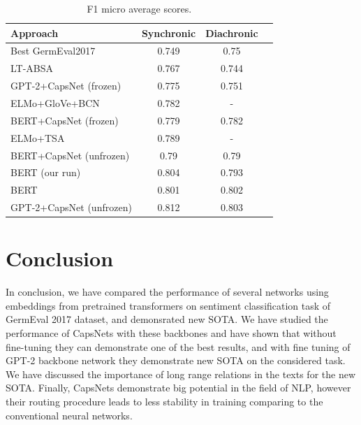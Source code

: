 \documentclass{article}
\begin{document}
\begin{table}[tbh!]
\begin{center}	
\begin{tabular}[t]{|l|ccc|}
\hline
Approach & Synchronic  & Diachronic \\
\hline
Best GermEval2017 \cite{germevaltask2017} & 0.749 & 0.75  \\ %
LT-ABSA \cite{ruppert2017lt} & 0.767 & 0.744 \\
GPT-2+CapsNet (frozen) & 0.775 & 0.751 \\
ELMo+GloVe+BCN \cite{biesialska2020sentiment} & 0.782 & - \\
BERT+CapsNet (frozen) & 0.779 & 0.782\\
ELMo+TSA \cite{biesialska2020sentiment} & 0.789 & - \\
BERT+CapsNet (unfrozen) & 0.79 & 0.79 \\
BERT (our run) & 0.804 & 0.793 \\
BERT \cite{kostic2020} & 0.801 & 0.802 \\
GPT-2+CapsNet (unfrozen) & 0.812 & 0.803\\
\hline
\end{tabular}
\caption{F1 micro average scores.}
\label{tab:sent}
\end{center}
\end{table}

\section{Conclusion}
In conclusion, we have compared the performance of several networks using embeddings from pretrained transformers on sentiment classification task of GermEval 2017 dataset, and demonsrated new SOTA. We have studied the performance of CapsNets with these backbones and have shown that without fine-tuning they can demonstrate one of the best results, and with fine tuning of GPT-2 backbone network they demonstrate new SOTA on the considered task. We have discussed the importance of long range relations in the texts for the new SOTA. Finally, CapsNets demonstrate big potential in the field of NLP, however their routing procedure leads to less stability in training comparing to the conventional neural networks.


\end{document}
